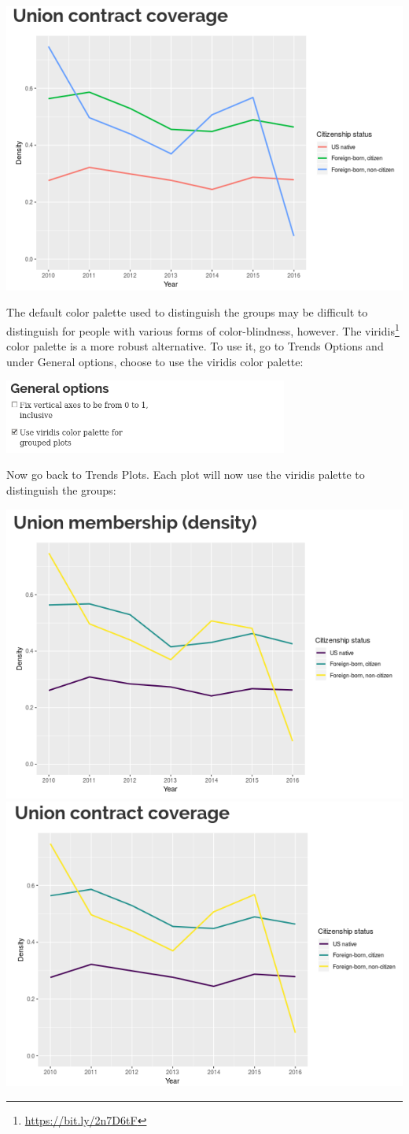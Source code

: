 \documentclass[letterpaper,12pt]{article}
\begin{document}
\begin{enumerate}
\begin{center}
    \includegraphics[width=0.49\linewidth]{images/trends_ex3/coverage_trend.png}
  \end{center}
  The default color palette used to distinguish the groups may be
  difficult to distinguish for people with various forms of
  color-blindness, however. The
  viridis\footnote{\url{https://bit.ly/2n7D6tF}} color palette is a
  more robust alternative. To use it, go to Trends \textrightarrow{}
  Options and under General options, choose to use the viridis color
  palette:
  \begin{center}
    \includegraphics[width=0.7\textwidth]{images/trends_ex3/viridis_options.png}
  \end{center}
  Now go back to Trends \textrightarrow{} Plots. Each plot will now
  use the viridis palette to distinguish the groups:
  \begin{center}
    \includegraphics[width=0.49\linewidth]{images/trends_ex3/membership_trend2.png}
    \includegraphics[width=0.49\linewidth]{images/trends_ex3/coverage_trend2.png}
  \end{center}


\end{enumerate}
\end{document}
